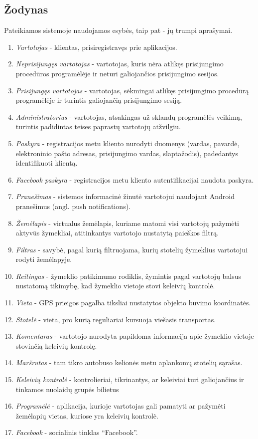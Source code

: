 \documentclass{VUMIFPSkursinis}
\begin{document}
\subsection{Žodynas}
Pateikiamos sistemoje naudojamos esybės, taip pat - jų trumpi aprašymai.
				\begin{enumerate}[label=E\arabic*,itemsep=-2mm]
					\item \textit{Vartotojas} - klientas, prisiregistravęs prie aplikacijos.
					\item \textit{Neprisijungęs vartotojas} - vartotojas, kuris nėra atlikęs prisijungimo procedūros programėlėje ir neturi galiojančios prisijungimo sesijos.
					\item \textit{Prisijungęs vartotojas} - vartotojas, sėkmingai atlikęs prisijungimo procedūrą programėlėje ir turintis galiojančią prisijungimo sesiją.
					\item \textit{Administratorius} - vartotojas, atsakingas už sklandų programėlės veikimą, turintis padidintas teises paprastų vartotojų atžvilgiu.
					\item \textit{Paskyra} - registracijos metu kliento nurodyti duomenys (vardas, pavardė, elektroninio pašto adresas, prisijungimo vardas, slaptažodis), padedantys identifikuoti klientą.
					\item \textit{Facebook paskyra} - registracijos metu kliento autentifikacijai naudota paskyra.
					\item \textit{Pranešimas} - sistemos informacinė žinutė vartotojui naudojant Android pranešimus (angl. push notifications).
					\item \textit{Žemėlapis} - virtualus žemėlapis, kuriame matomi visi vartotojų pažymėti aktyvūs žymekliai, atitinkantys vartotojo nustatytą paieškos filtrą.
					\item \textit{Filtras} - savybė, pagal kurią filtruojama, kurių stotelių žymeklius vartotojui rodyti žemėlapyje.
					\item \textit{Reitingas} - žymeklio patikimumo rodiklis, žymintis pagal vartotojų balsus nustatomą tikimybę, kad žymeklio vietoje stovi keleivių kontrolė. 
					\item \textit{Vieta} - GPS prieigos pagalba tiksliai nustatytos objekto buvimo koordinatės.
					\item \textit{Stotelė} - vieta, pro kurią reguliariai kursuoja viešasis transportas.
					\item \textit{Komentaras} - vartotojo nurodyta papildoma informacija apie žymeklio vietoje stovinčią keleivių kontrolę.
					\item \textit{Maršrutas} - tam tikro autobuso kelionės metu aplankomų stotelių sąrašas.
					\item \textit{Keleivių kontrolė} - kontrolieriai, tikrinantys, ar keleiviai turi galiojančius ir tinkamos nuolaidų grupės bilietus
					\item \textit{Programėlė} - aplikacija, kurioje vartotojas gali pamatyti ar pažymėti žemėlapių vietas, kuriose yra keleivių kontrolė.
					\item \textit{Facebook} - socialinis tinklas “Facebook”.
				\end{enumerate}
\end{document}
